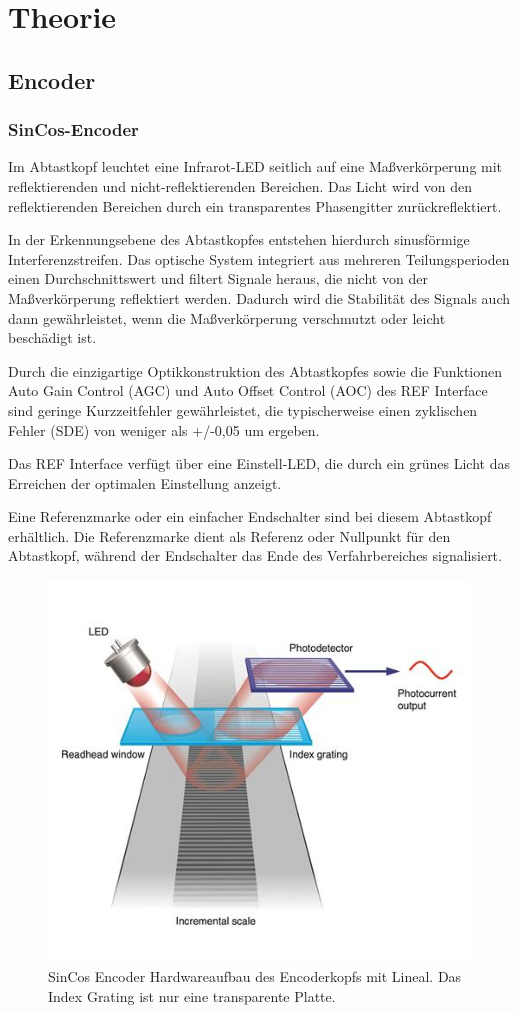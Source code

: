\section{Theorie}
	\subsection{Encoder}
		\subsubsection{SinCos-Encoder}
			Im Abtastkopf leuchtet eine Infrarot-LED seitlich auf eine Maßverkörperung mit reflektierenden und nicht-reflektierenden Bereichen. Das Licht wird von den reflektierenden Bereichen durch ein transparentes Phasengitter zurückreflektiert.
			
			In der Erkennungsebene des Abtastkopfes entstehen hierdurch sinusförmige Interferenzstreifen. Das optische System integriert aus mehreren Teilungsperioden einen Durchschnittswert und filtert Signale heraus, die nicht von der Maßverkörperung reflektiert werden. Dadurch wird die Stabilität des Signals auch dann gewährleistet, wenn die Maßverkörperung verschmutzt oder leicht beschädigt ist.
			
			Durch die einzigartige Optikkonstruktion des Abtastkopfes sowie die Funktionen Auto Gain Control (AGC) und Auto Offset Control (AOC) des REF Interface sind geringe Kurzzeitfehler gewährleistet, die typischerweise einen zyklischen Fehler (SDE) von weniger als +/-0,05 um ergeben.
			
			Das REF Interface verfügt über eine Einstell-LED, die durch ein grünes Licht das Erreichen der optimalen Einstellung anzeigt.
			
			Eine Referenzmarke oder ein einfacher Endschalter sind bei diesem Abtastkopf erhältlich. Die Referenzmarke dient als Referenz oder Nullpunkt für den Abtastkopf, während der Endschalter das Ende des Verfahrbereiches signalisiert.
			\begin{figure}
				\centering
				\includegraphics[width=0.7\linewidth]{./pics/sincos_encoder}
				\caption{SinCos Encoder Hardwareaufbau des Encoderkopfs mit Lineal. Das Index Grating ist nur eine transparente Platte.}
			\end{figure}
